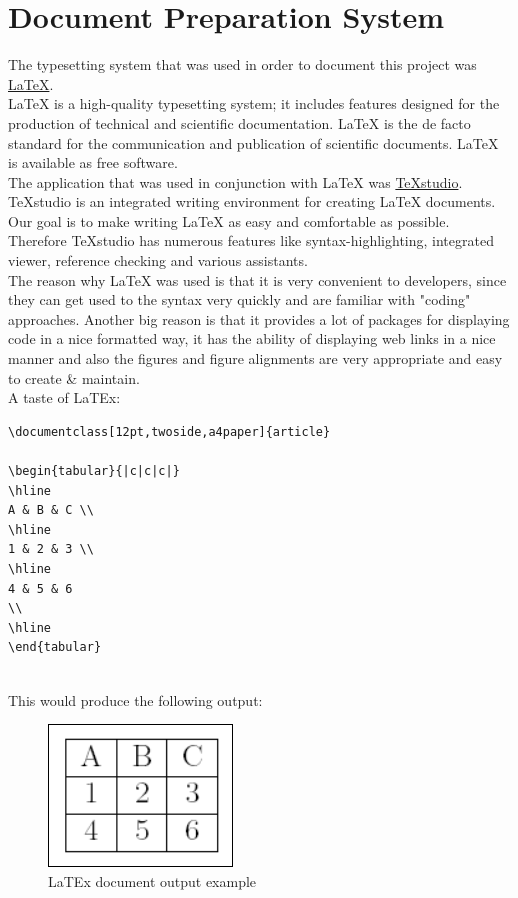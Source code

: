 \section{Document Preparation System}
The typesetting system that was used in order to document this project was \href{https://www.LaTeX-project.org/}{LaTeX}.\\
LaTeX is a high-quality typesetting system; it includes features designed for the production of technical and scientific documentation. LaTeX is the de facto standard for the communication and publication of scientific documents. LaTeX is available as free software. \cite{WhatIsLaTeX}\\
The application that was used in conjunction with LaTeX was \href{http://texstudio.sourceforge.net/}{TeXstudio}.
TeXstudio is an integrated writing environment for creating LaTeX documents. Our goal is to make writing LaTeX as easy and comfortable as possible. Therefore TeXstudio has numerous features like syntax-highlighting, integrated viewer, reference checking and various assistants. \cite{WhatIsTeXStudio}\\
The reason why LaTeX was used is that it is very convenient to developers, since they can get used to the syntax very quickly and are familiar with "coding" approaches. Another big reason is that it provides a lot of packages for displaying code in a nice formatted way, it has the ability of displaying web links in a nice manner and also the figures and figure alignments are very appropriate and easy to create \& maintain.\\
A taste of LaTEx: \cite{LaTExExample}
\begin{verbatim}
\documentclass[12pt,twoside,a4paper]{article} 
 
\begin{tabular}{|c|c|c|} 
\hline 
A & B & C \\ 
\hline 
1 & 2 & 3 \\ 
\hline 
4 & 5 & 6 
\\ 
\hline 
\end{tabular} 
 
\end{verbatim}
This would produce the following output:
\begin{figure}[H]
	\begin{center}
		\includegraphics[scale=1]{./Images/Implementation/latex_example.png}
		\caption{LaTEx document output example \cite{LaTExExample}}
	\end{center}
\end{figure}